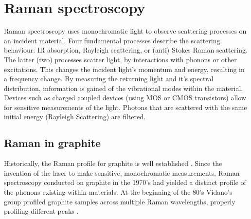 \documentclass[../Matt_Gebert_Honours_Thesis.tex]{subfiles}
\begin{document}

\section{Raman spectroscopy}

Raman spectroscopy uses monochromatic light to observe scattering processes on an incident material. Four fundamental processes describe the scattering behaviour: IR absorption, Rayleigh scattering, or (anti) Stokes Raman scattering. The latter (two) processes scatter light, by interactions with phonons or other excitations. This changes the incident light's momentum and energy, resulting in a frequency change. By measuring the returning light and it's spectral distribution, information is gained of the vibrational modes within the material. Devices such as charged coupled devices (using MOS or CMOS transistors) allow for sensitive measurements of the light. Photons that are scattered with the same initial energy (Rayleigh Scattering) are filtered.

\subsection{Raman in graphite}
Historically, the Raman profile for graphite is well established \cite{vidano_observation_1981}. Since the invention of the laser to make sensitive, monochromatic measurements, Raman spectroscopy conducted on graphite in the 1970's had yielded a distinct profile of the phonons existing within  materials\cite{nemanich_first-_1979,tuinstra_characterization_1970,tuinstra_raman_1970}. At the beginning of the 80's Vidano's group profiled graphite samples across multiple Raman wavelengths, properly profiling different peaks \cite{vidano_observation_1981}. 
\end{document}

